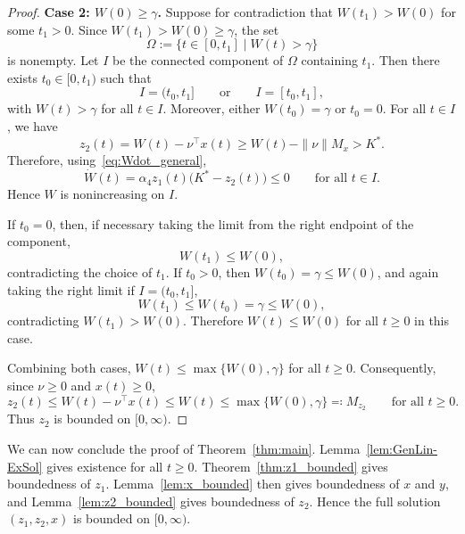 \documentclass{article}
\begin{document}
\begin{proof}
\textbf{Case 2: $W(0)\ge\gamma$.} 
Suppose for contradiction that 
$W(t_1)>W(0)$ for some $t_1>0$. Since $W(t_1)>W(0)\ge\gamma$, the set
\begin{equation*}
    \Omega:=\{t\in[0,t_1]\mid W(t)>\gamma\}
\end{equation*}
is nonempty. Let $I$ be the connected component of $\Omega$ containing $t_1$.
Then there exists $t_0\in[0,t_1)$ such that
\begin{equation*}
    I=(t_0,t_1]
    \qquad\text{or}\qquad
    I=[t_0,t_1],
\end{equation*}
with $W(t)>\gamma$ for all $t\in I$. Moreover, either $W(t_0)=\gamma$ or $t_0=0$.
For all $t\in I$, we have
\begin{equation*}
    z_2(t) = W(t)-\nu^\top x(t) 
    \ge W(t)-\|\nu\|M_x > K^*.
\end{equation*}
Therefore, using~\eqref{eq:Wdot_general},
\begin{equation*}
    \dot W(t) = \alpha_4 z_1(t)\bigl(K^*-z_2(t)\bigr)\le 0
    \qquad\text{for all }t\in I.
\end{equation*}
Hence $W$ is nonincreasing on $I$.

If $t_0=0$, then, if necessary taking the limit from the right endpoint of the component,
\begin{equation*}
    W(t_1)\le W(0),
\end{equation*}
contradicting the choice of $t_1$. If $t_0>0$, then $W(t_0)=\gamma\le W(0)$, and again
taking the right limit if $I=(t_0, t_1]$,
\begin{equation*}
    W(t_1)\le W(t_0)=\gamma\le W(0),
\end{equation*}
contradicting $W(t_1)>W(0)$. Therefore $W(t)\le W(0)$ for all $t\ge0$ in this case.

Combining both cases, $W(t)\le\max\{W(0),\gamma\}$ for all $t\ge 0$.
Consequently, since $\nu\ge0$ and $x(t)\ge0$,
\begin{equation*}
    z_2(t) \le W(t)-\nu^\top x(t) \le W(t) \le \max\{W(0),\gamma\}\eqqcolon M_{z_2}
    \qquad\text{for all } t\ge 0.
\end{equation*}
Thus $z_2$ is bounded on $[0,\infty)$.
\end{proof}

We can now conclude the proof of Theorem~\ref{thm:main}. Lemma~\ref{lem:GenLin-ExSol} gives existence for all $t\ge0$. Theorem~\ref{thm:z1_bounded} gives boundedness of $z_1$. Lemma~\ref{lem:x_bounded} then gives boundedness of $x$ and $y$, and Lemma~\ref{lem:z2_bounded} gives boundedness of $z_2$. Hence the full solution $(z_1,z_2,x)$ is bounded on $[0,\infty)$.
\end{document}
